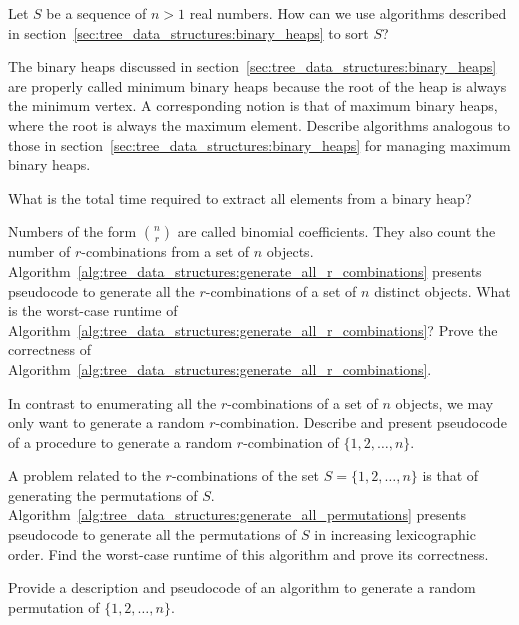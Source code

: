 \begin{problem}
\item Let $S$ be a sequence of $n > 1$ real numbers. How can we use
  algorithms described in
  section~\ref{sec:tree_data_structures:binary_heaps} to sort $S$?

\item The binary heaps discussed in
  section~\ref{sec:tree_data_structures:binary_heaps} are properly
  called minimum binary heaps because the
  root of the heap is always the minimum vertex. A corresponding
  notion is that of maximum binary heaps,
  where the root is always the maximum element. Describe algorithms
  analogous to those in
  section~\ref{sec:tree_data_structures:binary_heaps} for managing
  maximum binary heaps.

\item What is the total time required to extract all elements from a
  binary heap?

\item Numbers of the form $\binom{n}{r}$ are called
  binomial coefficients. They also count
  the number of $r$-combinations from a set of $n$ objects.
  Algorithm~\ref{alg:tree_data_structures:generate_all_r_combinations}
  presents pseudocode to generate all the $r$-combinations of a set of
  $n$ distinct objects. What is the worst-case runtime of
  Algorithm~\ref{alg:tree_data_structures:generate_all_r_combinations}?
  Prove the correctness of
  Algorithm~\ref{alg:tree_data_structures:generate_all_r_combinations}.

\item In contrast to enumerating all the $r$-combinations of a set of
  $n$ objects, we may only want to generate a random
  $r$-combination. Describe and present pseudocode of a procedure to
  generate a random $r$-combination of $\{1, 2, \dots, n\}$.

\item A problem related to the $r$-combinations of the set
  $S = \{1, 2, \dots, n\}$ is that of generating the permutations of
  $S$. Algorithm~\ref{alg:tree_data_structures:generate_all_permutations}
  presents pseudocode to generate all the permutations of $S$ in
  increasing lexicographic order. Find the worst-case runtime of this
  algorithm and prove its correctness.

\item Provide a description and pseudocode of an algorithm to generate
  a random permutation of $\{1, 2, \dots, n\}$.


\end{problem}
